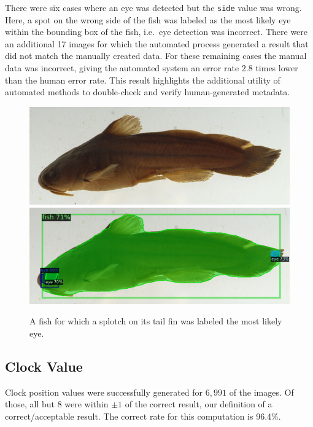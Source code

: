 \documentclass[conference]{IEEEtran}
\begin{document}
There were six cases where an eye was detected but the \verb|side| value
was wrong. Here, a spot on the wrong side of the fish was labeled as the
most likely eye within the bounding box of the fish, i.e.~eye detection 
was incorrect.
There were an additional 17 images for which the automated process generated a result that did not match the manually created data. For these remaining cases the manual data was incorrect, giving the automated system an error rate \(2.8\) times lower than the human error rate.
This result highlights the additional utility of automated methods to
double-check and verify human-generated metadata.

\begin{figure}[H]
  \centering
  \includegraphics[width=0.49\linewidth]{images/wrong_side_orig}
  \includegraphics[width=0.49\linewidth]{images/wrong_side1}
  \caption{A fish for which a splotch on its tail fin was labeled the most likely eye.}
\end{figure}

\subsection{Clock Value}
Clock position values were successfully generated for \(6,991\) of the images. Of those, all but 8 were within \(\pm{}1\) of the correct result,
our definition of a correct/acceptable result. The correct rate for this
computation is 96.4\%.
\end{document}
